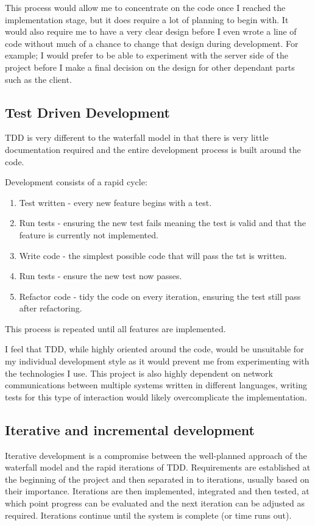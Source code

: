 \documentclass[a4papert,11pt,notitlepage]{ltxdoc}
\begin{document}
This process would allow me to concentrate on the code once I reached the implementation stage, but it does require a lot of planning to begin with. It would also require me to have a very clear design before I even wrote a line of code without much of a chance to change that design during development. For example; I would prefer to be able to experiment with the server side of the project before I make a final decision on the design for other dependant parts such as the client.

\subsection{Test Driven Development}
TDD is very different to the waterfall model in that there is very little documentation required and the entire development process is built around the code.

Development consists of a rapid cycle:
\begin{enumerate}
\item Test written - every new feature begins with a test.
\item Run tests - ensuring the new test fails meaning the test is valid and that the feature is currently not implemented.
\item Write code - the simplest possible code that will pass the tst is written.
\item Run tests - ensure the new test now passes.
\item Refactor code - tidy the code on every iteration, ensuring the test still pass after refactoring.
\end{enumerate}
This process is repeated until all features are implemented.

I feel that TDD, while highly oriented around the code, would be unsuitable for my individual development style as it would prevent me from experimenting with the technologies I use. This project is also highly dependent on network communications between multiple systems written in different languages, writing tests for this type of interaction would likely overcomplicate the implementation.

\subsection{Iterative and incremental development}
Iterative development is a compromise between the well-planned approach of the waterfall model and the rapid iterations of TDD. Requirements are established at the beginning of the project and then separated in to iterations, usually based on their importance. Iterations are then implemented, integrated and then tested, at which point progress can be evaluated and the next iteration can be adjusted as required. Iterations continue until the system is complete (or time runs out).
\end{document}
